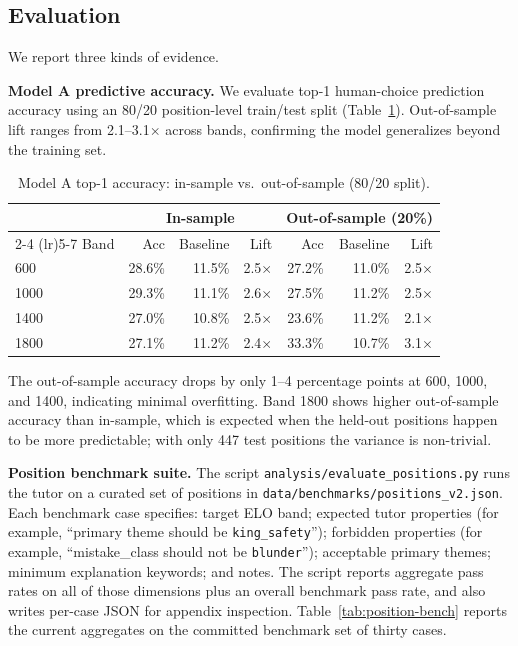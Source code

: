 \documentclass[11pt]{article}
\begin{document}
\subsection{Evaluation}
We report three kinds of evidence.

\textbf{Model A predictive accuracy.} We evaluate top-1 human-choice prediction accuracy using an 80/20 position-level train/test split (Table~\ref{tab:modelA-accuracy}). Out-of-sample lift ranges from 2.1--3.1$\times$ across bands, confirming the model generalizes beyond the training set.

\begin{table}[h]
\centering
\caption{Model A top-1 accuracy: in-sample vs.\ out-of-sample (80/20 split).}
\label{tab:modelA-accuracy}
\begin{tabular}{@{}lrrrrrr@{}}
\toprule
 & \multicolumn{3}{c}{In-sample} & \multicolumn{3}{c}{Out-of-sample (20\%)} \\
\cmidrule(lr){2-4} \cmidrule(lr){5-7}
Band & Acc & Baseline & Lift & Acc & Baseline & Lift \\
\midrule
600  & 28.6\% & 11.5\% & 2.5$\times$ & 27.2\% & 11.0\% & 2.5$\times$ \\
1000 & 29.3\% & 11.1\% & 2.6$\times$ & 27.5\% & 11.2\% & 2.5$\times$ \\
1400 & 27.0\% & 10.8\% & 2.5$\times$ & 23.6\% & 11.2\% & 2.1$\times$ \\
1800 & 27.1\% & 11.2\% & 2.4$\times$ & 33.3\% & 10.7\% & 3.1$\times$ \\
\bottomrule
\end{tabular}
\end{table}

The out-of-sample accuracy drops by only 1--4 percentage points at 600, 1000, and 1400, indicating minimal overfitting. Band 1800 shows higher out-of-sample accuracy than in-sample, which is expected when the held-out positions happen to be more predictable; with only 447 test positions the variance is non-trivial.

\textbf{Position benchmark suite.} The script \texttt{analysis/evaluate\_positions.py} runs the tutor on a curated set of positions in \texttt{data/benchmarks/positions\_v2.json}. Each benchmark case specifies: target ELO band; expected tutor properties (for example, ``primary theme should be \texttt{king\_safety}''); forbidden properties (for example, ``mistake\_class should not be \texttt{blunder}''); acceptable primary themes; minimum explanation keywords; and notes. The script reports aggregate pass rates on all of those dimensions plus an overall benchmark pass rate, and also writes per-case JSON for appendix inspection. Table~\ref{tab:position-bench} reports the current aggregates on the committed benchmark set of thirty cases.
\end{document}
